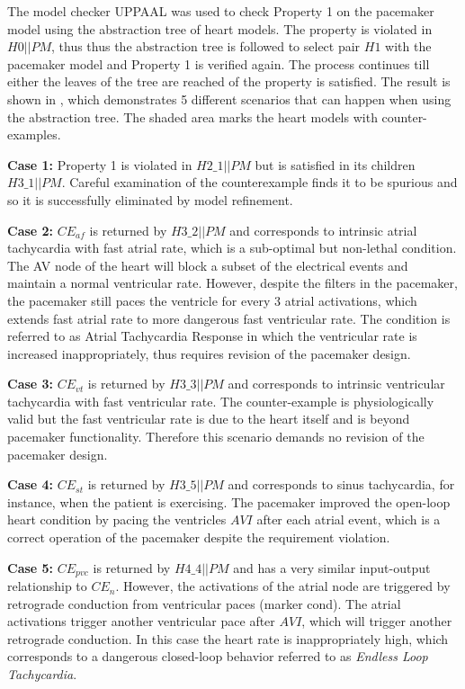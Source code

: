 The model checker UPPAAL\cite{uppaal} was used to check Property 1 on the pacemaker model using the abstraction tree of heart models.
The property is violated in $H0 || PM$, thus thus the abstraction tree is followed to select pair $H1$ with the pacemaker model and Property 1 is verified again.
The process continues till either the leaves of the tree are reached of the property is satisfied.
The result is shown in , which demonstrates 5 different scenarios that can happen when using the abstraction tree.
The shaded area marks the heart models with counter-examples.

\textbf{Case 1:} Property 1 is violated in $H2\_1 || PM$ but is satisfied in its children $H3\_1 || PM$.
Careful examination of the counterexample finds it to be spurious and so it is successfully eliminated by model refinement.

\textbf{Case 2:} $CE_{af}$ is returned by $H3\_2 || PM$ and corresponds to intrinsic atrial tachycardia with fast atrial rate, which is a sub-optimal but non-lethal condition.
The AV node of the heart will block a subset of the electrical events and maintain a normal ventricular rate.
However, despite the filters in the pacemaker, the pacemaker still paces the ventricle for every 3 atrial activations, which extends fast atrial rate to more dangerous fast ventricular rate. 
The condition is referred to as Atrial Tachycardia Response in which the ventricular rate is increased inappropriately, thus requires revision of the pacemaker design.

\textbf{Case 3:} $CE_{vt}$ is returned by $H3\_3 || PM$ and corresponds to intrinsic ventricular tachycardia with fast ventricular rate.
The counter-example is physiologically valid but the fast ventricular rate is due to the heart itself and is beyond pacemaker functionality.
Therefore this scenario demands no revision of the pacemaker design.

\textbf{Case 4:}  $CE_{st}$ is returned by $H3\_5 || PM$ and corresponds to sinus tachycardia, for instance, when the patient is exercising.
The pacemaker improved the open-loop heart condition by pacing the ventricles $AVI$ after each atrial event, which is a correct operation of the pacemaker despite the requirement violation. 

\textbf{Case 5:} $CE_{pvc}$ is returned by $H4\_4 || PM$ and has a very similar input-output relationship to $CE_{n}$. 
However, the activations of the atrial node are triggered by retrograde conduction from ventricular paces (marker \textsf{cond}). 
The atrial activations trigger another ventricular pace after $AVI$, which will trigger another retrograde conduction. In this case the heart rate is inappropriately high, which corresponds to a dangerous closed-loop behavior referred to as \emph{Endless Loop Tachycardia}.

